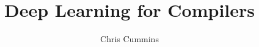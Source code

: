 

\title{Deep Learning for Compilers}
\author{Chris Cummins}

\abstract{}

\newif\ifstapled


  
  
  
  
  
  
  
  
  
